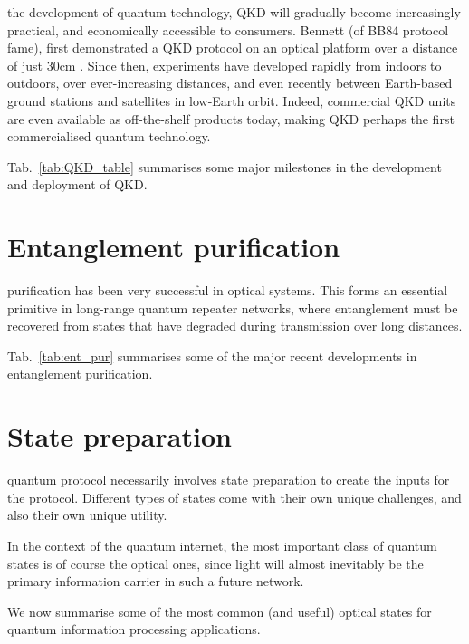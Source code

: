  the development of quantum technology, QKD will gradually become increasingly practical, and economically accessible to consumers. Bennett (of BB84 protocol fame), first demonstrated a QKD protocol on an optical platform over a distance of just 30cm \cite{bib:JC_5_3}. Since then, experiments have developed rapidly from indoors to outdoors, over ever-increasing distances, and even recently between Earth-based ground stations and satellites in low-Earth orbit. Indeed, commercial QKD units are even available as off-the-shelf products today, making QKD perhaps the first commercialised quantum technology.

Tab.~\ref{tab:QKD_table} summarises some major milestones in the development and deployment of QKD.

%
%

\section{Entanglement purification} 

 purification has been very successful in optical systems. This forms an essential primitive in long-range quantum repeater networks, where entanglement must be recovered from states that have degraded during transmission over long distances.

 Tab.~\ref{tab:ent_pur} summarises some of the  major recent developments in entanglement purification.

%
%

\section{State preparation} 

 quantum protocol necessarily involves state preparation to create the inputs for the protocol. Different types of states come with their own unique challenges, and also their own unique utility.

In the context of the quantum internet, the most important class of quantum states is of course the optical ones, since light will almost inevitably be the primary information carrier in such a future network.

We now summarise some of the most common (and useful) optical states for quantum information processing applications.

%
%

